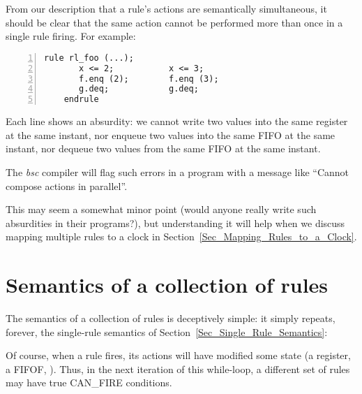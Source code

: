 \label{Sec_Parallel_Conflict}

From our description that a rule's actions are semantically
simultaneous, it should be clear that the same action cannot be
performed more than once in a single rule firing.  For example:

{\footnotesize
\begin{Verbatim}[frame=single, numbers=left]
    rule rl_foo (...);
       x <= 2;           x <= 3;
       f.enq (2);        f.enq (3);
       g.deq;            g.deq;
    endrule
\end{Verbatim}
}

Each line shows an absurdity: we cannot write two values into the same
register at the same instant, nor enqueue two values into the same
FIFO at the same instant, nor dequeue two values from the same FIFO at
the same instant.

The \emph{bsc} compiler will flag such errors in a program with a
message like ``Cannot compose actions in parallel''.

This may seem a somewhat minor point (would anyone really write such
absurdities in their programs?), but understanding it will help when
we discuss mapping multiple rules to a clock in
Section~\ref{Sec_Mapping_Rules_to_a_Clock}.


\section{Semantics of a collection of rules}

\label{Sec_Rules_Semantics}


The semantics of a collection of rules is deceptively simple: it
simply repeats, forever, the single-rule semantics of
Section~\ref{Sec_Single_Rule_Semantics}:

\begin{center}
\end{center}

Of course, when a rule fires, its actions will have modified some
state (a register, a FIFOF, {\etc}).  Thus, in the next iteration of
this while-loop, a different set of rules may have true CAN\_FIRE
conditions.

